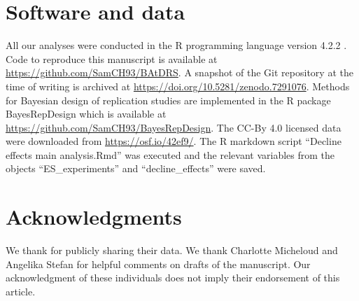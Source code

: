 \section*{Software and data}
All our analyses were conducted in the R programming language version 4.2.2
\citep{R}. Code to reproduce this manuscript is available at
\url{https://github.com/SamCH93/BAtDRS}. A snapshot of the Git repository at the
time of writing is archived at \url{https://doi.org/10.5281/zenodo.7291076}.
Methods for Bayesian design of replication studies are implemented in the R
package BayesRepDesign which is available at
\url{https://github.com/SamCH93/BayesRepDesign}. The CC-By 4.0 licensed data
were downloaded from \url{https://osf.io/42ef9/}. The R markdown script
``Decline effects main analysis.Rmd'' was executed and the relevant variables
from the objects ``ES\_experiments'' and ``decline\_effects'' were saved.

\section*{Acknowledgments}
We thank \citet{Protzko2020} for publicly sharing their data. We thank Charlotte
Micheloud and Angelika Stefan for helpful comments on drafts of the manuscript.
Our acknowledgment of these individuals does not imply their endorsement of this
article.

